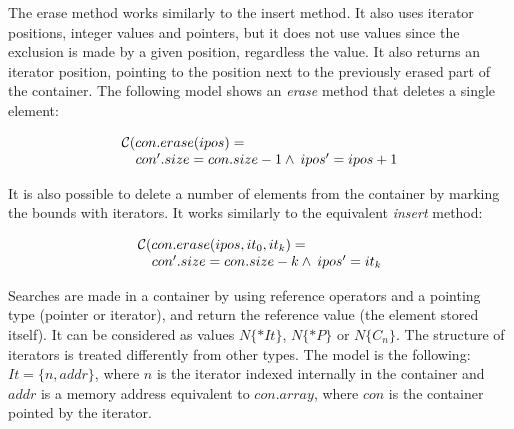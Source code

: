 \documentclass[conference]{IEEEtran}
\newcommand{\comment}[1]{}
\begin{document}
The erase method works similarly to the insert method. It also uses iterator
positions, integer values and pointers, but it does not use values since the exclusion
is made by a given position, regardless the value. It also returns an iterator position,
pointing to the position next to the previously erased part of the container.
The following model shows an \textit{erase} method that deletes a single element:

\[\begin{array}{ll}
\multicolumn{2}{l}{{\cal C}(con.erase(ipos)=}\\
  & con'.size = con.size - 1 \wedge \: ipos' = ipos + 1
\end{array}\]

It is also possible to delete a number of elements from the container by
marking the bounds with iterators. It works similarly to the equivalent
\textit{insert} method:

\[\begin{array}{ll}
\multicolumn{2}{l}{{\cal C}(con.erase(ipos, it_0, it_k)=}\\
  & 	con'.size = con.size - k \wedge \: ipos' = it_k
\end{array}\]

Searches are made in a container by using reference operators
and a pointing type (pointer or iterator), and return the reference
value (the element stored itself). It can be considered as values
$N\{*It\}$, $N\{*P\}$ or $N\{C_n\}$.	The structure of iterators
is treated differently from other types. The model is the following:
$It = \{n, addr\}$,
where $n$ is the iterator indexed
internally in the container and $addr$ is a memory
address equivalent to $con.array$, where $con$ is the container
pointed by the iterator.


\comment{
To build the operational model, it is important
to define a class structure that is as close as to the
real implementation so that ESBMC++ can correctly identify
the relationships between classes in a given program and
then introduce such relationships to build the AST.}
\end{document}
